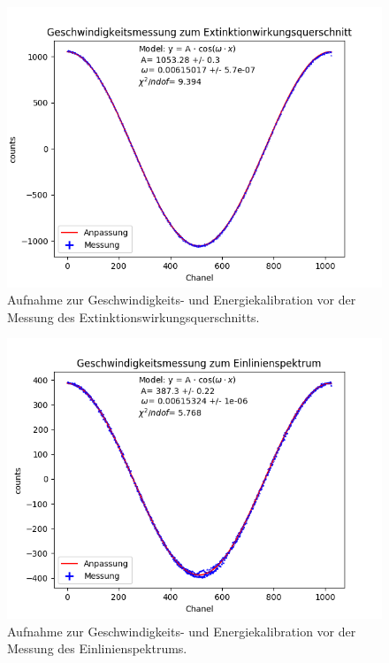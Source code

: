 \documentclass[12pt,a4paper]{article}
\begin{document}
\begin{figure} [H]
\centering
\includegraphics[scale=0.8]{Bilder/Kalibration/Extinktion.png}
\caption{Aufnahme zur Geschwindigkeits- und Energiekalibration vor der Messung des Extinktionswirkungsquerschnitts.}
\end{figure}

\begin{figure} [H]
\centering
\includegraphics[scale=0.8]{Bilder/Kalibration/Einlinien.png}
\caption{Aufnahme zur Geschwindigkeits- und Energiekalibration vor der Messung des Einlinienspektrums.}
\end{figure}
\end{document}
